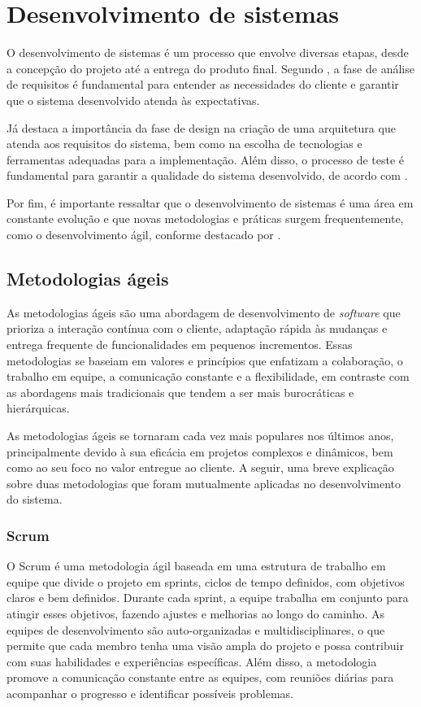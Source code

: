 \section{Desenvolvimento de sistemas}\label{sec:dev_sistemas}
O desenvolvimento de sistemas é um processo que envolve diversas etapas, desde a concepção do projeto até a entrega do produto final. Segundo \cite{pressman2016engenharia}, a fase de análise de requisitos é fundamental para entender as necessidades do cliente e garantir que o sistema desenvolvido atenda às expectativas. 

Já \cite{somerville2015engenharia} destaca a importância da fase de design na criação de uma arquitetura que atenda aos requisitos do sistema, bem como na escolha de tecnologias e ferramentas adequadas para a implementação. Além disso, o processo de teste é fundamental para garantir a qualidade do sistema desenvolvido, de acordo com \cite{myers2012art}. 

Por fim, é importante ressaltar que o desenvolvimento de sistemas é uma área em constante evolução e que novas metodologias e práticas surgem frequentemente, como o desenvolvimento ágil, conforme destacado por \cite{martin2008agile}.
\subsection{Metodologias ágeis}\label{ssec:metodologias_ageis}
As metodologias ágeis são uma abordagem de desenvolvimento de \textit{software} que prioriza a interação contínua com o cliente, adaptação rápida às mudanças e entrega frequente de funcionalidades em pequenos incrementos. Essas metodologias se baseiam em valores e princípios que enfatizam a colaboração, o trabalho em equipe, a comunicação constante e a flexibilidade, em contraste com as abordagens mais tradicionais que tendem a ser mais burocráticas e hierárquicas. 

As metodologias ágeis se tornaram cada vez mais populares nos últimos anos, principalmente devido à sua eficácia em projetos complexos e dinâmicos, bem como ao seu foco no valor entregue ao cliente. A seguir, uma breve explicação sobre duas metodologias que foram mutualmente aplicadas no desenvolvimento do sistema.
\subsubsection{Scrum}\label{sssec:scrum}
O Scrum é uma metodologia ágil baseada em uma estrutura de trabalho em equipe que divide o projeto em sprints, ciclos de tempo definidos, com objetivos claros e bem definidos. Durante cada sprint, a equipe trabalha em conjunto para atingir esses objetivos, fazendo ajustes e melhorias ao longo do caminho. As equipes de desenvolvimento são auto-organizadas e multidisciplinares, o que permite que cada membro tenha uma visão ampla do projeto e possa contribuir com suas habilidades e experiências específicas. Além disso, a metodologia promove a comunicação constante entre as equipes, com reuniões diárias para acompanhar o progresso e identificar possíveis problemas.

